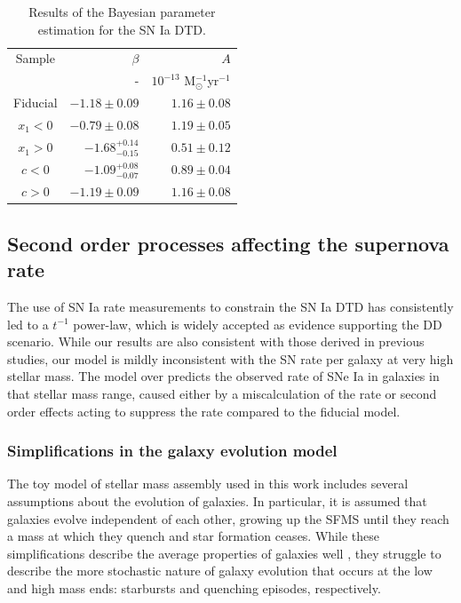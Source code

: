 \documentclass[fleqn,usenatbib]{mnras}
\begin{document}
\renewcommand{\arraystretch}{1.2}
\begin{table}
	\centering
	\caption{Results of the Bayesian parameter estimation for the SN Ia DTD.}
	\label{tab:dtd_results_split_lc}
	\begin{tabular}{crr} %
		\hline
		 Sample &$\beta$ & $A$ \\
		 &-       & $10^{-13}$ M$_{\odot}^{-1}$yr$^{-1}$ \\
		\hline
		Fiducial & $-1.18\pm0.09$ &  $1.16\pm0.08$ \\
	    $x_1 < 0$ & $-0.79\pm0.08$ &  $1.19 \pm0.05$ \\
		$x_1 > 0$ & $-1.68 _{ -0.15} ^{ +0.14}$ & $0.51\pm0.12$ \\
		$c < 0$ & $-1.09 _{ -0.07} ^{ +0.08}$ & $0.89\pm0.04$ \\
		$c > 0$ & $-1.19\pm0.09$ & $1.16\pm0.08$ \\
		\hline
	\end{tabular}
\end{table}
\subsection{Second order processes affecting the supernova rate \label{subsec:discussion}}

The use of SN Ia rate measurements to constrain the SN Ia DTD has consistently led to a $t^{-1}$ power-law, which is widely accepted as evidence supporting the DD scenario. While our results are also consistent with those derived in previous studies, our model is mildly inconsistent with the SN rate per galaxy at very high stellar mass. The model over predicts the observed rate of SNe Ia in galaxies in that stellar mass range, caused either by a miscalculation of the rate or second order effects acting to suppress the rate compared to the fiducial model.

\subsubsection{Simplifications in the galaxy evolution model}

The toy model of stellar mass assembly used in this work includes several assumptions about the evolution of galaxies. In particular, it is assumed that galaxies evolve independent of each other, growing up the SFMS until they reach a mass at which they quench and star formation ceases. While these simplifications describe the average properties of galaxies well \citep{Zahid2012, Childress2014}, they struggle to describe the more stochastic nature of galaxy evolution that occurs at the low and high mass ends: starbursts and quenching episodes, respectively. 
\end{document}
